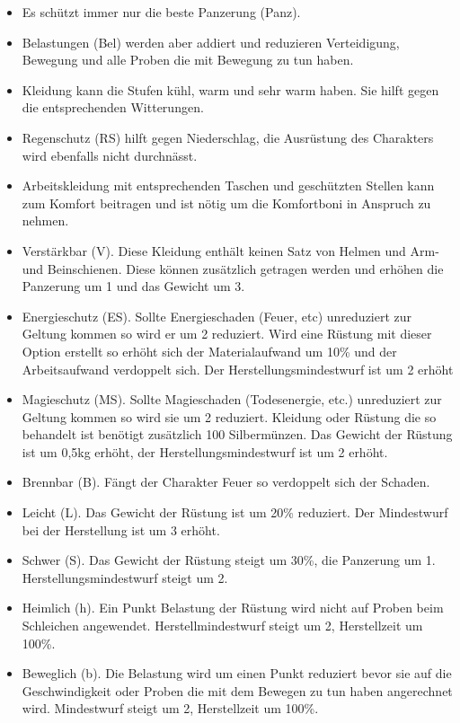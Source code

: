 \documentclass{article}
\begin{document}
\begin{itemize}
\item Es schützt immer nur die beste Panzerung (Panz).
\item Belastungen (Bel) werden aber addiert und reduzieren Verteidigung, Bewegung und alle Proben die mit Bewegung zu tun haben.
\item Kleidung kann die Stufen kühl, warm und sehr warm haben. Sie hilft gegen die entsprechenden Witterungen.
\item Regenschutz (RS) hilft gegen Niederschlag, die Ausrüstung des Charakters wird ebenfalls nicht durchnässt.
\item Arbeitskleidung mit entsprechenden Taschen und geschützten Stellen kann zum Komfort beitragen und ist nötig um die Komfortboni in Anspruch zu nehmen.
\item Verstärkbar (V). Diese Kleidung enthält keinen Satz von Helmen und Arm- und Beinschienen. Diese können zusätzlich getragen werden und erhöhen die Panzerung um 1 und das Gewicht um 3.
\item Energieschutz (ES). Sollte Energieschaden (Feuer, etc) unreduziert zur Geltung kommen so wird er um 2 reduziert. Wird eine Rüstung mit dieser Option erstellt so erhöht sich der Materialaufwand um 10\% und der Arbeitsaufwand verdoppelt sich. Der Herstellungsmindestwurf ist um 2 erhöht
\item Magieschutz (MS). Sollte Magieschaden (Todesenergie, etc.) unreduziert zur Geltung kommen so wird sie um 2 reduziert. Kleidung oder Rüstung die so behandelt ist benötigt zusätzlich 100 Silbermünzen. Das Gewicht der Rüstung ist um 0,5kg erhöht, der Herstellungsmindestwurf ist um 2 erhöht.
\item Brennbar (B). Fängt der Charakter Feuer so verdoppelt sich der Schaden.
\item Leicht (L). Das Gewicht der Rüstung ist um 20\% reduziert. Der Mindestwurf bei der Herstellung ist um 3 erhöht.
\item Schwer (S). Das Gewicht der Rüstung steigt um 30\%, die Panzerung um 1. Herstellungsmindestwurf steigt um 2.
\item Heimlich (h). Ein Punkt Belastung der Rüstung wird nicht auf Proben beim Schleichen angewendet. Herstellmindestwurf steigt um 2, Herstellzeit um 100\%.
\item Beweglich (b). Die Belastung wird um einen Punkt reduziert bevor sie auf die Geschwindigkeit oder Proben die mit dem Bewegen zu tun haben angerechnet wird. Mindestwurf steigt um 2, Herstellzeit um 100\%.
\end{itemize}
\end{document}
